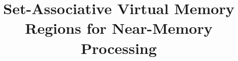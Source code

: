\documentclass[pageno]{jpaper}
\begin{document}

\title{Set-Associative Virtual Memory Regions for Near-Memory Processing}

\date{}
\maketitle

\thispagestyle{empty}





%











%
%
\end{document}
